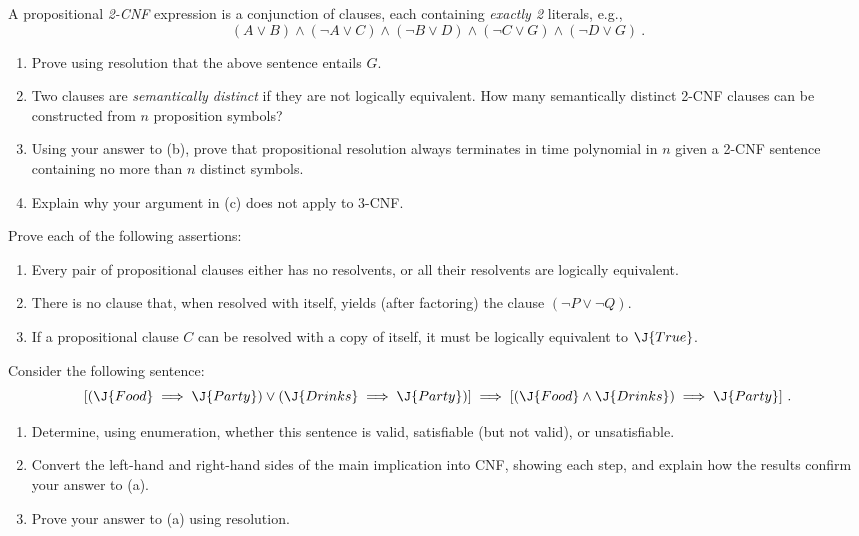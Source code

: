 \begin{uexercise}%
A propositional {\em 2-CNF} expression is a conjunction of clauses,
each containing {\em exactly 2} literals, e.g., 
\[
  (A\lor B) \land (\lnot A \lor C) \land (\lnot B \lor D) \land (\lnot
  C \lor G) \land (\lnot D \lor G)\ .
\]
\begin{enumerate}
\item  Prove using resolution that the above sentence entails \(G\).
\item  Two clauses are {\em semantically distinct} if they are not logically equivalent.
How many semantically distinct 2-CNF clauses can be constructed from \(n\) proposition symbols?
\item  Using your answer to (b), prove that propositional resolution always
terminates in time polynomial in \(n\) given a 2-CNF sentence containing no more than \(n\) distinct symbols.
\item  Explain why your argument in (c) does not apply to 3-CNF.
\end{enumerate}
\end{uexercise} 

\begin{iexercise}%
Prove each of the following assertions:
\begin{enumerate}
\item Every pair of propositional clauses either has no resolvents,
or all their resolvents are logically equivalent.
\item  There is no clause that, when resolved with itself, yields
(after factoring) the clause \((\lnot P \lor \lnot Q)\).
\item  If a propositional clause \(C\) can be resolved with a copy
of itself, it must be logically equivalent to \(\J{True}\).
\end{enumerate}
\end{iexercise} 

\begin{exercise}%
Consider the following sentence:
\[
  [ (\J{Food} \implies \J{Party}) \lor (\J{Drinks} \implies \J{Party}) ] \implies [ ( \J{Food} \land \J{Drinks} )  \implies \J{Party}]\ .
\]
\begin{enumerate}
\item  Determine, using enumeration,  whether this sentence is valid, satisfiable (but not valid), or unsatisfiable.

\item  Convert the left-hand and right-hand sides of the main implication into CNF, showing each step,
and explain how the results confirm your answer to (a).
\item  Prove your answer to (a) using resolution.
\end{enumerate}
\end{exercise} 

